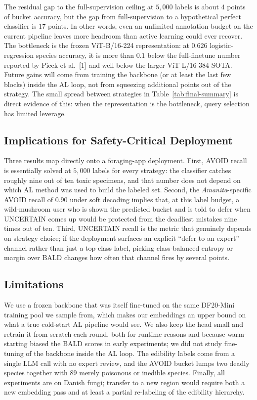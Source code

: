\documentclass[11pt]{article}
\begin{document}
The residual gap to the full-supervision ceiling at $5{,}000$ labels is
about $4$ points of bucket accuracy, but the gap from full-supervision to
a hypothetical perfect classifier is $17$ points. In other words, even an
unlimited annotation budget on the current pipeline leaves more headroom
than active learning could ever recover. The bottleneck is the frozen
ViT-B/16-224 representation: at $0.626$ logistic-regression species
accuracy, it is more than $0.1$ below the full-finetune number reported by
Picek et al.~[1] and well below the larger ViT-L/16-384 SOTA. Future
gains will come from training the backbone (or at least the last few
blocks) inside the AL loop, not from squeezing additional points out of
the strategy. The small spread between strategies in
Table~\ref{tab:final-summary} is direct evidence of this: when the
representation is the bottleneck, query selection has limited leverage.

\subsection{Implications for Safety-Critical Deployment}

Three results map directly onto a foraging-app deployment. First, AVOID
recall is essentially solved at $5{,}000$ labels for every strategy: the
classifier catches roughly nine out of ten toxic specimens, and that
number does not depend on which AL method was used to build the labeled
set. Second, the \emph{Amanita}-specific AVOID recall of $0.90$ under
soft decoding implies that, at this label budget, a wild-mushroom user
who is shown the predicted bucket and is told to defer when UNCERTAIN
comes up would be protected from the deadliest mistakes nine times out of
ten. Third, UNCERTAIN recall is the metric that genuinely depends on
strategy choice; if the deployment surfaces an explicit ``defer to an
expert'' channel rather than just a top-class label, picking
class-balanced entropy or margin over BALD changes how often that channel
fires by several points.

\subsection{Limitations}

We use a frozen backbone that was itself fine-tuned on the same DF20-Mini
training pool we sample from, which makes our embeddings an upper bound
on what a true cold-start AL pipeline would see. We also keep the head
small and retrain it from scratch each round, both for runtime reasons
and because warm-starting biased the BALD scores in early experiments;
we did not study fine-tuning of the backbone inside the AL loop. The
edibility labels come from a single LLM call with no expert review, and
the AVOID bucket lumps two deadly species together with $89$ merely
poisonous or inedible species. Finally, all experiments are on Danish
fungi; transfer to a new region would require both a new embedding pass
and at least a partial re-labeling of the edibility hierarchy.
\end{document}

